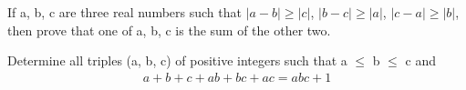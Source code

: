 \item If a, b, c are three real numbers such that $|a-b| \geq |c|$, $|b-c| \geq |a|$, $|c-a| \geq |b|$, then prove that one of a, b, c is the sum of the other two.

\item Determine all triples (a, b, c) of positive integers such that a $\leq$ b $\leq$ c and 
\begin{align*}
a + b + c + ab + bc + ac = abc + 1
\end{align*}
